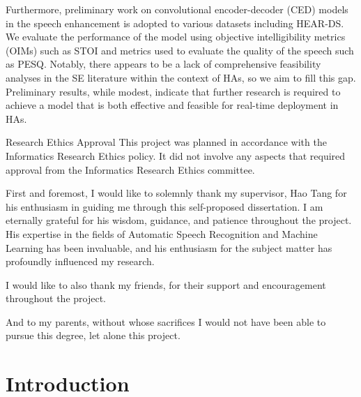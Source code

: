 \documentclass[logo,bsc,singlespacing,parskip,online]{infthesis}
\begin{document}
\begin{preliminary}
{   Furthermore, preliminary work on convolutional encoder-decoder (CED) 
   models in the speech enhancement is adopted to various datasets 
   including HEAR-DS. We evaluate the performance of the model 
   using objective intelligibility metrics (OIMs) such as STOI and 
   metrics used to evaluate the quality of the speech such as PESQ. 
   Notably, there appears to be a lack of comprehensive feasibility analyses in 
   the SE literature within the context of HAs, so we aim to fill this gap. 
   Preliminary results, while modest, indicate that further research is required 
   to achieve a model that is both effective and feasible for real-time deployment in HAs.
}

\maketitle

\newenvironment{ethics}
   {\begin{frontenv}{Research Ethics Approval}{\LARGE}}
   {\end{frontenv}\newpage}

\begin{ethics}
This project was planned in accordance with the Informatics Research
Ethics policy. It did not involve any aspects that required approval
from the Informatics Research Ethics committee.

\standarddeclaration
\end{ethics}


\begin{acknowledgements}
First and foremost, I would like to solemnly thank my supervisor, Hao Tang for 
his enthusiasm in guiding me through this self-proposed dissertation. I am eternally grateful for his wisdom, guidance, and patience throughout the project.
His expertise in the fields of Automatic Speech Recognition and Machine Learning has been invaluable, and his enthusiasm for the subject matter has profoundly influenced my research.

I would like to also thank my friends, for their support and encouragement throughout the project. 

And to my parents, without whose sacrifices I would not have been able to pursue this degree, let alone this project.
\end{acknowledgements}


\tableofcontents
\end{preliminary}


\chapter{Introduction}
\end{document}
